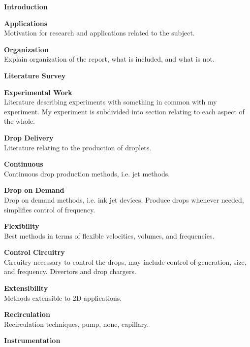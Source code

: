 \documentclass{report}
\begin{document}
\begin{outline}
  \item {\bf Introduction }
  \begin{outline}
    \item {\bf Applications } \\
      Motivation for research and applications related to the
      subject.
    \item {\bf Organization } \\
      Explain organization of the report, what is included, and what
      is not.
  \end{outline}
  \item {\bf Literature Survey }
  \begin{outline}
    \item {\bf Experimental Work } \\
      Literature describing experiments with something in common with
      my experiment.  My experiment is subdivided into section
      relating to each aspect of the whole.
    \begin{outline}
      \item {\bf Drop Delivery } \\
  Literature relating to the production of droplets.
      \begin{outline}
  \item {\bf Continuous } \\
    Continuous drop production methods, i.e. jet methods.
  \item {\bf Drop on Demand } \\
    Drop on demand methods, i.e. ink jet devices.  Produce drops
    whenever needed, simplifies control of frequency.
  \item {\bf Flexibility } \\
    Best methods in terms of flexible velocities, volumes, and
    frequencies.
  \item {\bf Control Circuitry } \\
    Circuitry necessary to control the drops, may include
    control of generation, size, and frequency.  Divertors and
    drop chargers.
  \item {\bf Extensibility } \\
    Methods extensible to 2D applications.
  \item {\bf Recirculation } \\
    Recirculation techniques, pump, none, capillary.
      \end{outline}
      \item {\bf Instrumentation } \\

\end{outline}
\end{outline}
\end{outline}
\end{document}

